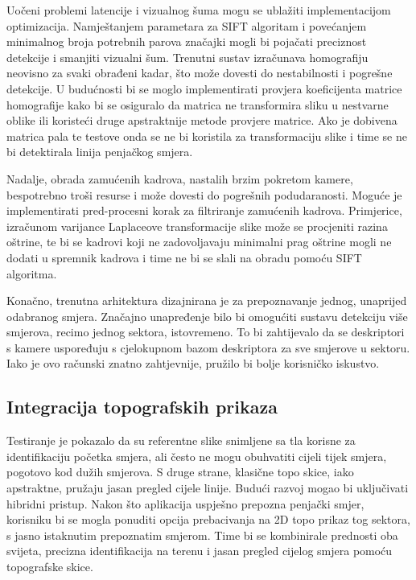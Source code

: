 Uočeni problemi latencije i vizualnog šuma mogu se ublažiti implementacijom optimizacija. Namještanjem parametara za SIFT algoritam i povećanjem minimalnog broja potrebnih parova značajki mogli bi pojačati preciznost detekcije i smanjiti vizualni šum. Trenutni sustav izračunava homografiju neovisno za svaki obrađeni kadar, što može dovesti do nestabilnosti i pogrešne detekcije. U budućnosti bi se moglo implementirati provjera koeficijenta matrice homografije kako bi se osiguralo da matrica ne transformira sliku u nestvarne oblike ili koristeći druge apstraktnije metode provjere matrice. Ako je dobivena matrica pala te testove onda se ne bi koristila za transformaciju slike i time se ne bi detektirala linija penjačkog smjera.

Nadalje, obrada zamućenih kadrova, nastalih brzim pokretom kamere, bespotrebno troši resurse i može dovesti do pogrešnih podudaranosti. Moguće je implementirati pred-procesni korak za filtriranje zamućenih kadrova. Primjerice, izračunom varijance Laplaceove transformacije slike može se procjeniti razina oštrine, te bi se kadrovi koji ne zadovoljavaju minimalni prag oštrine mogli ne dodati u spremnik kadrova i time ne bi se slali na obradu pomoću SIFT algoritma.

Konačno, trenutna arhitektura dizajnirana je za prepoznavanje jednog, unaprijed odabranog smjera. Značajno unapređenje bilo bi omogućiti sustavu detekciju više smjerova, recimo jednog sektora, istovremeno. To bi zahtijevalo da se deskriptori s kamere uspoređuju s cjelokupnom bazom deskriptora za sve smjerove u sektoru. Iako je ovo računski znatno zahtjevnije, pružilo bi bolje korisničko iskustvo.

\subsection{Integracija topografskih prikaza}


Testiranje je pokazalo da su referentne slike snimljene sa tla korisne za identifikaciju početka smjera, ali često ne mogu obuhvatiti cijeli tijek smjera, pogotovo kod dužih smjerova. S druge strane, klasične topo skice, iako apstraktne, pružaju jasan pregled cijele linije. Budući razvoj mogao bi uključivati hibridni pristup. Nakon što aplikacija uspješno prepozna penjački smjer, korisniku bi se mogla ponuditi opcija prebacivanja na 2D topo prikaz tog sektora, s jasno istaknutim prepoznatim smjerom. Time bi se kombinirale prednosti oba svijeta, precizna identifikacija na terenu i jasan pregled cijelog smjera pomoću topografske skice.
